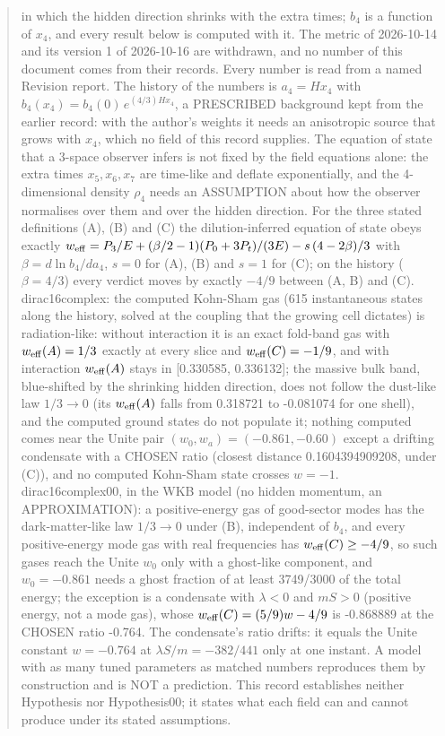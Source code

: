 \documentclass[11pt]{article}
\begin{document}
\begin{abstract}
in which the hidden direction shrinks with the extra times; $b_4$ is a function of $x_4$, and every result below is computed with it. The metric of 2026-10-14 and its version 1 of 2026-10-16 are withdrawn, and no number of this document comes from their records. Every number is read from a named Revision report. The history of the numbers is $a_4 = Hx_4$ with $b_4(x_4) = b_4(0)\,e^{(4/3)Hx_4}$, a PRESCRIBED background kept from the earlier record: with the author's weights it needs an anisotropic source that grows with $x_4$, which no field of this record supplies. The equation of state that a 3-space observer infers is not fixed by the field equations alone: the extra times $x_5, x_6, x_7$ are time-like and deflate exponentially, and the 4-dimensional density $\rho_4$ needs an ASSUMPTION about how the observer normalises over them and over the hidden direction. For the three stated definitions (A), (B) and (C) the dilution-inferred equation of state obeys exactly $w_{\rm eff} = P_3/E + (\beta/2 - 1)(P_0 + 3P_t)/(3E) - s\,(4 - 2\beta)/3$ with $\beta = d\ln b_4/da_4$, $s = 0$ for (A), (B) and $s = 1$ for (C); on the history ($\beta = 4/3$) every verdict moves by exactly $-4/9$ between (A, B) and (C). dirac16complex: the computed Kohn-Sham gas (615 instantaneous states along the history, solved at the coupling that the growing cell dictates) is radiation-like: without interaction it is an exact fold-band gas with $w_{\rm eff}(A) = 1/3$ exactly at every slice and $w_{\rm eff}(C) = -1/9$, and with interaction $w_{\rm eff}(A)$ stays in [0.330585, 0.336132]; the massive bulk band, blue-shifted by the shrinking hidden direction, does not follow the dust-like law $1/3 \to 0$ (its $w_{\rm eff}(A)$ falls from 0.318721 to -0.081074 for one shell), and the computed ground states do not populate it; nothing computed comes near the Unite pair $(w_0, w_a) = (-0.861, -0.60)$ except a drifting condensate with a CHOSEN ratio (closest distance 0.1604394909208, under (C)), and no computed Kohn-Sham state crosses $w = -1$. dirac16complex00, in the WKB model (no hidden momentum, an APPROXIMATION): a positive-energy gas of good-sector modes has the dark-matter-like law $1/3 \to 0$ under (B), independent of $b_4$, and every positive-energy mode gas with real frequencies has $w_{\rm eff}(C) \geq -4/9$, so such gases reach the Unite $w_0$ only with a ghost-like component, and $w_0 = -0.861$ needs a ghost fraction of at least 3749/3000 of the total energy; the exception is a condensate with $\lambda < 0$ and $mS > 0$ (positive energy, not a mode gas), whose $w_{\rm eff}(C) = (5/9)w - 4/9$ is -0.868889 at the CHOSEN ratio -0.764. The condensate's ratio drifts: it equals the Unite constant $w = -0.764$ at $\lambda S/m = -382/441$ only at one instant. A model with as many tuned parameters as matched numbers reproduces them by construction and is NOT a prediction. This record establishes neither Hypothesis nor Hypothesis00; it states what each field can and cannot produce under its stated assumptions.

\end{abstract}
\end{document}

